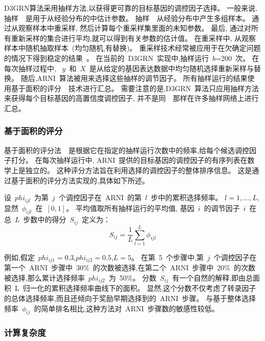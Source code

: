 D3GRN算法采用抽样方法,以获得更可靠的目标基因的调控因子选择。
一般来说,抽样~\cite{efron1994introduction}~是用于从经验分布的中估计参数。
抽样~\cite{efron1994introduction}~从经验分布中产生多组样本。
通过从观察样本中重采样, 然后计算每个重采样集里面的未知参数。
最后, 通过对所有重新采样的集合进行平均,就可以得到有关参数的估计值。
在重采样中, 从观察样本中随机抽取样本~(均匀随机,有替换)。
重采样技术经常被应用于在欠确定问题的情况下得到稳定的结果~\cite{wang2011random}。
在当前的~D3GRN~实现中,抽样运行~$b$=200~次。
在每次抽样过程中, 
~$y$~和~$X$~是从给定的基因表达数据中均匀随机选择重新采样与替换。
随后,ARNI~算法被用来选择这些抽样的调节因子。
所有抽样运行的结果使用基于面积的评分~\cite{Haury2012}~技术进行汇总。
需要注意的是,D3GRN~算法只应用抽样方法来获得每个目标基因的高置信度调控因子,
并不是同~\cite{Haury2012}~那样在许多抽样网络上进行汇总。


\subsubsection{基于面积的评分}
基于面积的评分法~\cite{singh2016blars}~是根据它在指定的抽样运行次数中的频率,给每个候选调控因子打分。
在每次抽样运行中, 
ARNI~提供的目标基因的调控因子的有序列表在数学上是独立的。
这种评分方法旨在利用选择的调控因子的整体排序信息。
这是通过基于面积的评分方法实现的,具体如下所述。

设~$phi_{ijl}$~为第~$j$~个调控因子在~ARNI~的第~$l$~步中的累积选择频率。
$l={1,\ldots,L}$,显然~$\phi_{ijl}$~在~$[0,1]$。
平均值取所有抽样运行的平均值, 
基因~$i$~的调节因子~$i$~在总~$L$~步数中的得分~$S_{ij}$~定义为：
\begin{equation}
\label{eq:scoring}
S_{ij} = \frac{1}{L} \sum_{l=1}^{L} \phi_{ijl}
\end{equation}

例如,假定~$phi_{ij1}=0.3$,$phi_{ij2}=0.5$,$L=5$。
在第~5~个步骤中,第~$j$~个调控因子在第一个~ARNI~步骤中~30\%~的次数被选择,在第二个~ARNI~步骤中~20\%~的次数被选择,那么累计选择频率~$phi_{ij2}$~为~50\%。
分数~$S_{ij}$~有一个自然的解释,即由总面积~L~归一化的累积选择频率曲线下的面积。
显然,这个分数不仅考虑了转录因子的总体选择频率,而且还倾向于奖励早期选择到的~ARNI~步骤。
与基于整体选择频率~$\phi_{ij}$~的简单排名相比,这种方法对~ARNI~步骤数的敏感性较低。

\subsubsection{计算复杂度}

